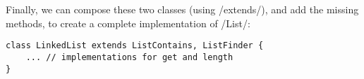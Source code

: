Finally, we can compose these two classes (using /extends/), and add the missing methods, to create a complete implementation of /List/:
\begin{lstlisting}
class LinkedList extends ListContains, ListFinder {
	... // implementations for get and length
}
\end{lstlisting}
\begin{comment}
Suppose that we want to write manual implementations of /pow/, specialised to a  specific exponent. Rather than fully inlining the recursion for each power, we can use \emph{inheritance} to reuse the implementations for previous exponents. Example:

\begin{lstlisting}
class Pow0 {
  @requires(x != 0)
  @ensures(result == x**0)
  Int pow(Int x) { return 0; }
}

...
class Pow4 extends Pow2 {
  @ensures(result == x**4)
  Int pow(Int x) { super.pow(x*x); }
}
...
\end{lstlisting}
Each class can be statically verified by relying on the previous one also being verified. Of course the above code dosn't look very usefully

\begin{comment}\subsection{Contracts in OO}
The concepts of pre and post conditions can be extended to object oriented programming~\cite{?}, consider for example:
\begin{lstlisting}
interface List {
  @requires(this.contains(o))
  @ensures(this.get(result) == o)
  Nat find(Object o);
	...
}
\end{lstlisting}
This means that in order for a call /a_list.find(o)/ to be correct, /a_list/ must contain /o/. In order for an implementation of /List.find/ to be correct, /this.find(o)/ must return an index that corresponds to /o/, assuming that /this/ contains /o/. Note that \emph{abstract} methods (such as /List.find/), are always trivially correct, however the type system of the language should ensure that the methods of all \emph{objects} are implemented.
\end{comment}


 

